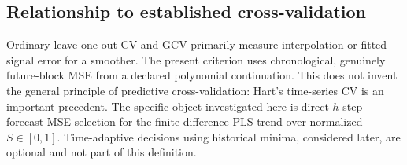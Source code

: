 \subsection{Relationship to established cross-validation}

Ordinary leave-one-out CV and GCV primarily measure
interpolation or fitted-signal error for a smoother.
The present criterion uses chronological, genuinely
future-block MSE from a declared polynomial continuation.
This does not invent the general principle of predictive
cross-validation: Hart's time-series CV
\cite{hart1994tscv} is an important precedent.
The specific object investigated here is direct
$h$-step forecast-MSE selection for the
finite-difference PLS trend over normalized $S\in[0,1]$.
Time-adaptive decisions using historical minima, considered
later, are optional and not part of this definition.
